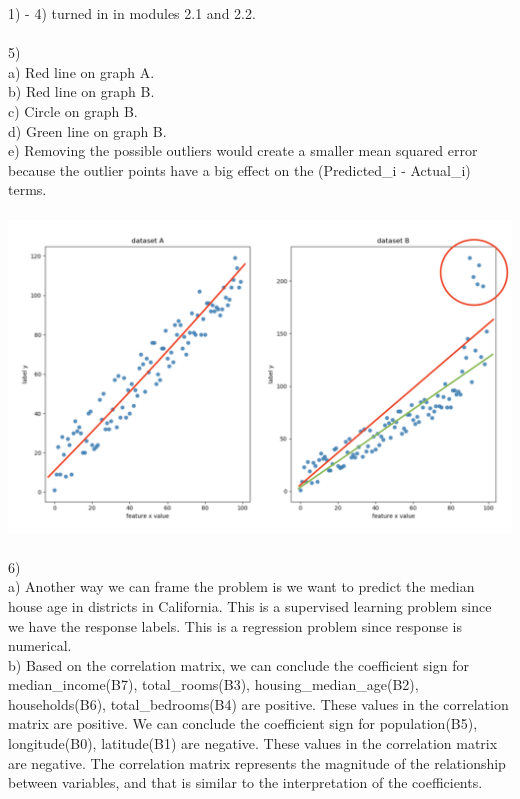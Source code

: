 \documentclass[11pt]{article}
\begin{document}

1) - 4) turned in in modules 2.1 and 2.2. \\ \\
5) \\
a) Red line on graph A.\\
b) Red line on graph B. \\
c) Circle on graph B. \\
d) Green line on graph B. \\
e) Removing the possible outliers would create a smaller mean squared error because the outlier points have a big effect on the (Predicted\_i - Actual\_i) terms.
\\
\\
\includegraphics[scale=0.5]{pic1}
\\
\\
6) \\
a) Another way we can frame the problem is we want to predict the median house age in districts in California. This is a supervised learning problem since we have the response labels. This is a regression problem since response is numerical.\\

b) Based on the correlation matrix, we can conclude the coefficient sign for median\_income(B7), total\_rooms(B3), housing\_median\_age(B2), households(B6), total\_bedrooms(B4) are positive. These values in the correlation matrix are positive. We can conclude the coefficient sign for population(B5), longitude(B0), latitude(B1) are negative. These values in the correlation matrix are negative. The correlation matrix represents the magnitude of the relationship between variables, and that is similar to the interpretation of the coefficients.\\
\end{document}
